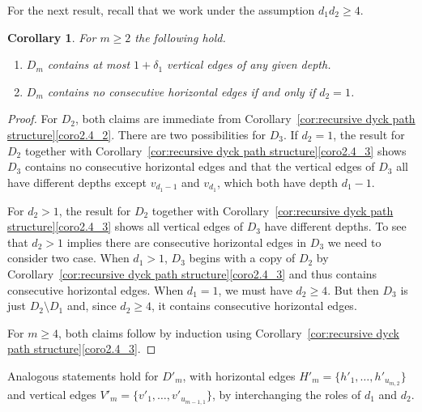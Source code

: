 \documentclass[10pt]{amsart}
\newtheorem{corollary}[theorem]{Corollary}
\theoremstyle{definition}
\begin{document}
For the next result, recall that we work under the assumption $d_1d_2\ge4$.
\begin{corollary}
 \label{cor:edge restrictions}
 For $m\ge2$ the following hold.
 \begin{enumerate}[label=(\alph*)]
 \item $D_m$ contains at most $1+\delta_1$ vertical edges of any given depth.
 \item $D_m$ contains no consecutive horizontal edges if and only if $d_2=1$.
 \end{enumerate}
\end{corollary}
\begin{proof}
 For $D_2$, both claims are immediate from Corollary~\ref{cor:recursive dyck path structure}\ref{coro2.4_2}.
 There are two possibilities for $D_3$.
 If $d_2=1$, the result for $D_2$ together with Corollary~\ref{cor:recursive dyck path structure}\ref{coro2.4_3} shows $D_3$ contains no consecutive horizontal edges and that the vertical edges of $D_3$ all have different depths except $v_{d_1-1}$ and $v_{d_1}$, which both have depth $d_1-1$.
 
 For $d_2>1$, the result for $D_2$ together with Corollary~\ref{cor:recursive dyck path structure}\ref{coro2.4_3} shows all vertical edges of $D_3$ have different depths.
 To see that $d_2>1$ implies there are consecutive horizontal edges in $D_3$ we need to consider two case.
 When $d_1>1$, $D_3$ begins with a copy of $D_2$ by Corollary~\ref{cor:recursive dyck path structure}\ref{coro2.4_3} and thus contains consecutive horizontal edges.
 When $d_1=1$, we must have $d_2\ge4$.
 But then $D_3$ is just $D_2\setminus D_1$ and, since $d_2\ge4$, it contains consecutive horizontal edges. 

 For $m\ge4$, both claims follow by induction using Corollary~\ref{cor:recursive dyck path structure}\ref{coro2.4_3}.
\end{proof}
Analogous statements hold for $D'_m$, with horizontal edges $H'_m=\{h'_1,\ldots,h'_{u_{m,2}}\}$ and vertical edges $V'_m=\{v'_1,\ldots,v'_{u_{m-1,1}}\}$, by interchanging the roles of $d_1$ and $d_2$.
\end{document}
